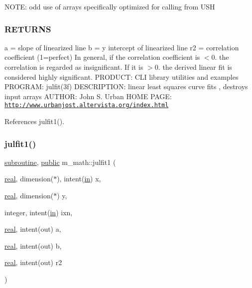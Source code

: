 N\+O\+TE\+: odd use of arrays specifically optimized for calling from U\+SH

\subsubsection*{R\+E\+T\+U\+R\+NS}

a = slope of linearized line b = y intercept of linearized line r2 = correlation coefficient (1=perfect) In general, if the correlation coefficient is $<$0. the correlation is regarded as insignificant. If it is $>$0. the derived linear fit is considered highly significant. P\+R\+O\+D\+U\+CT\+: C\+LI library utilities and examples P\+R\+O\+G\+R\+AM\+: julfit(3f) D\+E\+S\+C\+R\+I\+P\+T\+I\+ON\+: linear least squares curve fits , destroys input arrays A\+U\+T\+H\+OR\+: John S. Urban H\+O\+ME P\+A\+GE\+: \href{http://www.urbanjost.altervista.org/index.html}{\tt http\+://www.\+urbanjost.\+altervista.\+org/index.\+html} 

References julfit1().

\mbox{\label{namespacem__math_a9a1a7478c87dda7eb126127970f70b7b}} 
\subsubsection{\texorpdfstring{julfit1()}{julfit1()}}
{\footnotesize\ttfamily \hyperlink{M__stopwatch_83_8txt_acfbcff50169d691ff02d4a123ed70482}{subroutine}, \hyperlink{M__stopwatch_83_8txt_a2f74811300c361e53b430611a7d1769f}{public} m\+\_\+math\+::julfit1 (\begin{DoxyParamCaption}\item[{\hyperlink{read__watch_83_8txt_abdb62bde002f38ef75f810d3a905a823}{real}, dimension($\ast$), intent(\hyperlink{M__journal_83_8txt_afce72651d1eed785a2132bee863b2f38}{in})}]{x,  }\item[{\hyperlink{read__watch_83_8txt_abdb62bde002f38ef75f810d3a905a823}{real}, dimension($\ast$)}]{y,  }\item[{integer, intent(\hyperlink{M__journal_83_8txt_afce72651d1eed785a2132bee863b2f38}{in})}]{ixn,  }\item[{\hyperlink{read__watch_83_8txt_abdb62bde002f38ef75f810d3a905a823}{real}, intent(out)}]{a,  }\item[{\hyperlink{read__watch_83_8txt_abdb62bde002f38ef75f810d3a905a823}{real}, intent(out)}]{b,  }\item[{\hyperlink{read__watch_83_8txt_abdb62bde002f38ef75f810d3a905a823}{real}, intent(out)}]{r2 }\end{DoxyParamCaption})}



